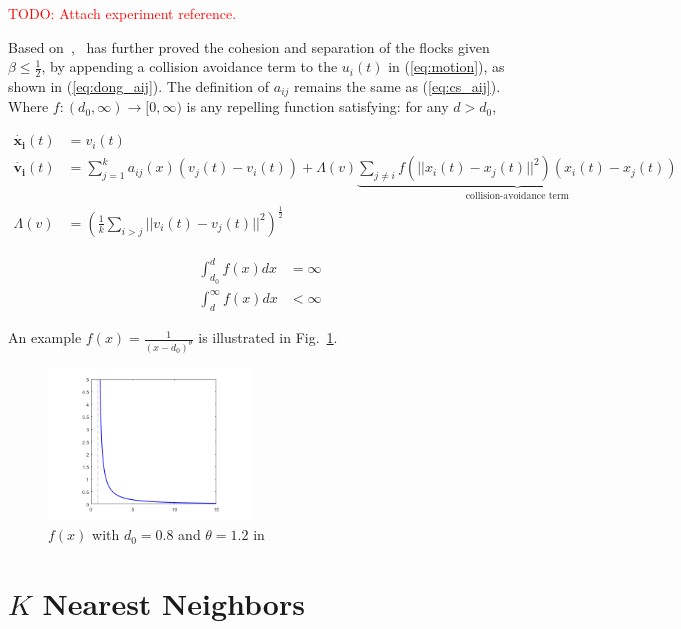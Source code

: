 \textcolor{red}{TODO: Attach experiment reference.}

Based on~\cite{CuckerSmale2007},~\cite{CuckerDong2010} has further proved the cohesion and separation of the flocks given $\beta\leq\frac{1}{2}$, by appending a collision avoidance term to the $u_i(t)$ in (\ref{eq:motion}), as shown in (\ref{eq:dong_aij}). The definition of $a_{ij}$ remains the same as (\ref{eq:cs_aij}). Where $f:(d_0,\infty)\to[0,\infty)$ is any repelling function satisfying: for any $d>d_0$,

\begin{equation}\label{eq:dong_aij}
\begin{aligned}
\dot{\mathbf{x_i}}(t)&=v_i(t)\\
\dot{\mathbf{v_i}}(t)&=\sum^k_{j=1}a_{ij}(x)(v_j(t)-v_i(t))+\Lambda(v)\underbrace{\sum_{j\neq i}f(||x_i(t)-x_j(t)||^2)(x_i(t)-x_j(t))}_{\text{collision-avoidance term}}\\
\Lambda(v)&=(\frac{1}{k}\sum_{i>j}||v_i(t)-v_j(t)||^2)^{\frac{1}{2}}
\end{aligned}
\end{equation}

\begin{equation}\label{eq:dong_f}
\begin{aligned}
\int_{d_0}^d f(x)dx&=\infty\\
\int_d^{\infty} f(x)dx&<\infty
\end{aligned}
\end{equation}

An example $f(x)=\frac{1}{(x-d_0)^{\theta}}$ is illustrated in Fig.~\ref{fig:dong_f}.

\begin{figure}[htb]
  \centering
  \includegraphics[width=0.48\textwidth]{figure/chapter_2/dong_f.png}
  \caption{$f(x)$ with $d_0=0.8$ and $\theta=1.2$ in ~\cite{CuckerDong2010}}
  \label{fig:dong_f}
\end{figure}

\section{$K$ Nearest Neighbors}

